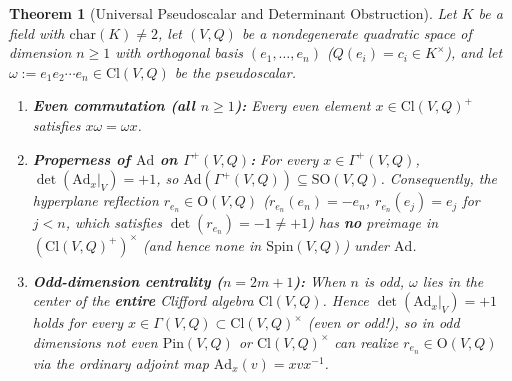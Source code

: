 \documentclass[11pt]{article}
\newtheorem{theorem}{Theorem}[section]
\theoremstyle{definition}
\theoremstyle{remark}
\newcommand{\Cl}{\mathrm{Cl}}
\newcommand{\Spin}{\mathrm{Spin}}
\newcommand{\Pin}{\mathrm{Pin}}
\newcommand{\Ad}{\mathrm{Ad}}
\newcommand{\SO}{\mathrm{SO}}
\newcommand{\Orth}{\mathrm{O}}
\begin{document}
\begin{theorem}[Universal Pseudoscalar and Determinant Obstruction]\label{thm:target-refutation}
Let $K$ be a field with $\mathrm{char}(K) \ne 2$, let $(V,Q)$ be a nondegenerate quadratic space of dimension $n \ge 1$ with orthogonal basis $(e_1, \dots, e_n)$ ($Q(e_i) = c_i \in K^\times$), and let $\omega := e_1 e_2 \cdots e_n \in \Cl(V,Q)$ be the pseudoscalar.
\begin{enumerate}
\item[(a)] \textbf{Even commutation (all $n \ge 1$):} Every even element $x \in \Cl(V,Q)^+$ satisfies $x \omega = \omega x$.
\item[(b)] \textbf{Properness of $\Ad$ on $\Gamma^+(V,Q)$:} For every $x \in \Gamma^+(V,Q)$, $\det(\Ad_x|_V) = +1$, so $\Ad(\Gamma^+(V,Q)) \subseteq \SO(V,Q)$. Consequently, the hyperplane reflection $r_{e_n} \in \Orth(V,Q)$ ($r_{e_n}(e_n) = -e_n$, $r_{e_n}(e_j) = e_j$ for $j < n$, which satisfies $\det(r_{e_n}) = -1 \ne +1$) has \textbf{no} preimage in $(\Cl(V,Q)^+)^\times$ (and hence none in $\Spin(V,Q)$) under $\Ad$.
\item[(c)] \textbf{Odd-dimension centrality ($n = 2m + 1$):} When $n$ is odd, $\omega$ lies in the center of the \textbf{entire} Clifford algebra $\Cl(V,Q)$. Hence $\det(\Ad_x|_V) = +1$ holds for \emph{every} $x \in \Gamma(V,Q) \subset \Cl(V,Q)^\times$ (even or odd!), so in odd dimensions not even $\Pin(V,Q)$ or $\Cl(V,Q)^\times$ can realize $r_{e_n} \in \Orth(V,Q)$ via the ordinary adjoint map $\Ad_x(v) = x v x^{-1}$.
\end{enumerate}
\end{theorem}
\end{document}
